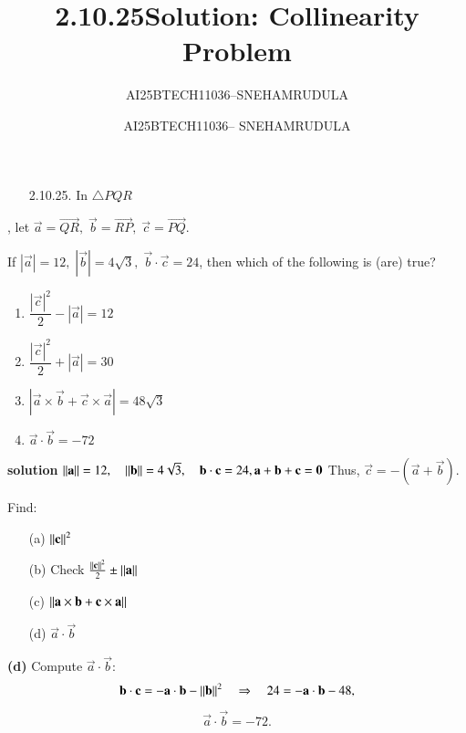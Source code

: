 \documentclass[journal]{IEEEtran}
\begin{document}

\vspace{3cm}
\title{2.10.25}
\author{AI25BTECH11036--SNEHAMRUDULA}
 \maketitle
{\let\newpage\relax\maketitle}

\renewcommand{\thefigure}{\theenumi}
\renewcommand{\thetable}{\theenumi}
\setlength{\intextsep}{10pt} %


\renewcommand{\thetable}{\theenumi}


\title{Solution: Collinearity Problem}
\author{AI25BTECH11036-- SNEHAMRUDULA}
\date{}


\maketitle
\begin{enumerate}
\item[2.10.25.] In $\triangle PQR$
\end{enumerate}, let 
  $\vec{a} = \overrightarrow{QR}, \; 
   \vec{b} = \overrightarrow{RP}, \; 
   \vec{c} = \overrightarrow{PQ}$.  

  If $|\vec{a}| = 12,\; |\vec{b}| = 4\sqrt{3},\; \vec{b}\cdot\vec{c} = 24$,  
  then which of the following is (are) true?  

  \begin{enumerate}[label=(\alph*), leftmargin=*]
    \item $\dfrac{|\vec{c}|^2}{2} - |\vec{a}| = 12$
    \item $\dfrac{|\vec{c}|^2}{2} + |\vec{a}| = 30$
    \item $|\vec{a} \times \vec{b} + \vec{c} \times \vec{a}| = 48\sqrt{3}$
    \item $\vec{a}\cdot\vec{b} = -72$
    \end{enumerate}

\textbf{solution}
$
\left\lVert\mathbf a\right\rVert = 12,\quad \left\lVert\mathbf b\right\rVert = 4\sqrt{3},\quad \mathbf b \cdot \mathbf c = 24,
\mathbf a + \mathbf b + \mathbf c = \mathbf 0$
Thus, $\vec c = -(\vec a + \vec b)$.

Find:
\begin{enumerate}
    \item[(a)] $\left\lVert\mathbf c\right\rVert^2$
    \item[(b)] Check $\frac{\left\lVert\mathbf c\right\rVert^2}{2} \pm \left\lVert\mathbf a\right\rVert$
    \item[(c)] $\left\lVert\mathbf a \times \mathbf b + \mathbf c \times \mathbf a\right\rVert$
    \item[(d)] $\vec a \cdot \vec b$
\end{enumerate}
\textbf{(d)} Compute $\vec a \cdot \vec b$:
\begin{align}
\mathbf b \cdot \mathbf c = -\mathbf a \cdot \mathbf b - \left\lVert\mathbf b\right\rVert^2
\quad \Rightarrow \quad 24 = -\mathbf a \cdot \mathbf b - 48,
\end{align}
\begin{align}
\vec a \cdot \vec b = -72.
\end{align}
\end{document}

